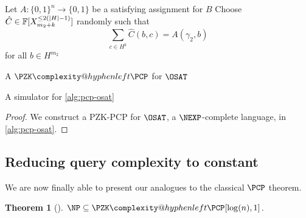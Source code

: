 \documentclass[english,12pt]{reedthesis}
\makeatletter
\theoremstyle{plain}
\newtheorem{thm}{Theorem}[section]
\theoremstyle{definition}
\theoremstyle{remark}
\DeclarePairedDelimiter{\abs}{\lvert}{\rvert}
\newcommand{\PZKPCP}{%
  \PZK\complexity@hyphenleft\PCP
}
\makeatother
\begin{document}
\begin{algorithm}[htbp]
  Let $A\colon \{0, 1\}^{n} \rightarrow \{0, 1\}$ be a satisfying assignment for $B$\;
  Choose $\hat{C} \in \mathbb{F}[X_{m_{2} + k}^{\le 2(\abs{H} - 1)}]$ randomly such
  that
  \[
    \sum_{c \in H^{k}}\hat{C}(b, c) = A(\gamma_{2}, b)
  \]
  for all $b \in H^{m_{2}}$\;
  \;
  \caption{A $\PZKPCP$ for $\OSAT$~\cite[Construction 6.4]{GOS25}}\label{alg:pcp-osat}
\end{algorithm}

\begin{algorithm}[htbp]
  \caption{A simulator for \cref{alg:pcp-osat}~\cite[Construction 6.7]{GOS25}}\label{alg:pcp-osat-sim}
\end{algorithm}

\begin{proof}
  We construct a PZK-PCP for $\OSAT$, a $\NEXP$-complete language, in
  \cref{alg:pcp-osat}.
\end{proof}

\subsection{Reducing query complexity to constant}\label{sec:constant-pcp-np}

We are now finally able to present our analogues to the classical $\PCP$
theorem.

\begin{thm}[{\cite[Theorem 2]{GOS25}}]\label{thm:zk-pcp}
  $\NP \subseteq \PZKPCP[\log(n), 1]$.
\end{thm}
\end{document}
